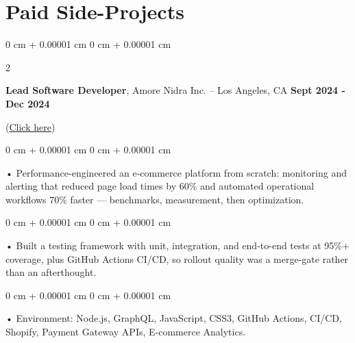 \documentclass[10pt, letterpaper]{article}
\newenvironment{onecolentry}{
    \begin{adjustwidth}{
        0 cm + 0.00001 cm
    }{
        0 cm + 0.00001 cm
    }
}{
    \end{adjustwidth}
} %
\newenvironment{twocolentry}[2][]{
    \onecolentry
    \def\secondColumn{#2}
    \setcolumnwidth{\fill, 4.5 cm}
    \begin{paracol}{2}
}{
    \switchcolumn \raggedleft \secondColumn
    \end{paracol}
    \endonecolentry
} %
\begin{document}
                        \vspace{0.4cm}
    \section{Paid Side-Projects}
            \vspace{2 pt }
        \begin{twocolentry}{
            \textbf{Sept 2024 - Dec 2024}
        }
            \textbf{Lead Software Developer}, Amore Nidra Inc. -- Los Angeles, CA\end{twocolentry}(\href{https://amorenidra.com}{Click here})

        \begin{onecolentry}
             • Performance-engineered an e-commerce platform from scratch: monitoring and alerting that reduced page load times by 60\% and automated operational workflows 70\% faster --- benchmarks, measurement, then optimization.
        \end{onecolentry}
        \begin{onecolentry}
             • Built a testing framework with unit, integration, and end-to-end tests at 95\%+ coverage, plus GitHub Actions CI/CD, so rollout quality was a merge-gate rather than an afterthought.
        \end{onecolentry}
        \begin{onecolentry}
             • Environment: Node.js, GraphQL, JavaScript, CSS3, GitHub Actions, CI/CD, Shopify, Payment Gateway APIs, E-commerce Analytics.
        \end{onecolentry}

        \vspace{0.4cm}
\end{document}
